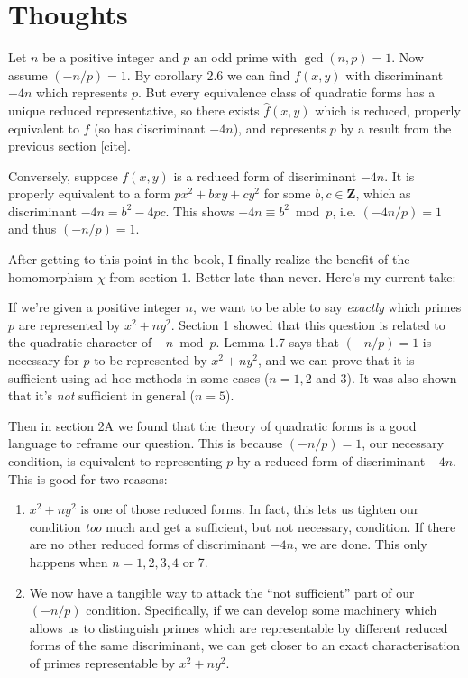 

\section{Thoughts}
Let $n$ be a positive integer and $p$ an odd prime with $\gcd(n,p)=1$. Now assume $(-n/p)=1$. By corollary 2.6 we can find $f(x,y)$ with discriminant $-4n$ which represents $p$. But every equivalence class of quadratic forms has a unique reduced representative, so there exists $\hat{f}(x,y)$ which is reduced, properly equivalent to $f$ (so has discriminant $-4n$), and represents $p$ by a result from the previous section [cite].

Conversely, suppose $f(x,y)$ is a reduced form of discriminant $-4n$. It is properly equivalent to a form $px^2 + bxy + cy^2$ for some $b,c\in\mathbf{Z}$, which as discriminant $-4n = b^2-4pc$. This shows $-4n\equiv b^2\bmod p$, i.e. $(-4n/p)=1$ and thus $(-n/p)=1$.

After getting to this point in the book, I finally realize the benefit of the homomorphism $\chi$ from section 1. Better late than never. Here's my current take:

If we're given a positive integer $n$, we want to be able to say \emph{exactly} which primes $p$ are represented by $x^2 + ny^2$. Section 1 showed that this question is related to the quadratic character of $-n\bmod p$. Lemma 1.7 says that $(-n/p)=1$ is necessary for $p$ to be represented by $x^2+ny^2$, and we can prove that it is sufficient using ad hoc methods in some cases ($n=1, 2$ and 3). It was also shown that it's \emph{not} sufficient in general ($n=5$).

Then in section 2A we found that the theory of quadratic forms is a good language to reframe our question. This is because $(-n/p)=1$, our necessary condition, is equivalent to representing $p$ by a reduced form of discriminant $-4n$. This is good for two reasons:

\begin{enumerate}
\item $x^2+ny^2$ is one of those reduced forms. In fact, this lets us tighten our condition \emph{too} much and get a sufficient, but not necessary, condition. If there are no other reduced forms of discriminant $-4n$, we are done. This only happens when $n=1,2,3,4$ or 7.

\item We now have a tangible way to attack the ``not sufficient'' part of our $(-n/p)$ condition. Specifically, if we can develop some machinery which allows us to distinguish primes which are representable by different reduced forms of the same discriminant, we can get closer to an exact characterisation of primes representable by $x^2+ny^2$.
\end{enumerate}

